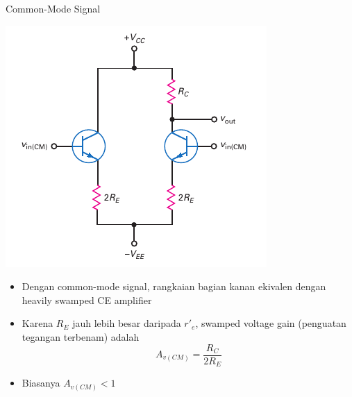 \documentclass[aspectratio=169]{beamer}
\begin{document}
\begin{frame}{Common-Mode Signal}
	\begin{multicols}{2}
		\begin{center}
			\includegraphics[height=0.7\textheight]{gambar/01.diff-amp/01.fig20}
		\end{center}
		\columnbreak
		\begin{itemize}
			\item Dengan common-mode signal, rangkaian bagian kanan ekivalen dengan heavily swamped CE amplifier
			\item Karena $ R_E $ jauh lebih besar daripada $ r'_e $, swamped voltage gain (penguatan tegangan terbenam) adalah
			\begin{equation}\label{pers.20}
				A_{v(CM)} = \frac{R_C}{2R_E}
			\end{equation}
			\item Biasanya $ A_{v(CM)} < 1 $
		\end{itemize}
	\end{multicols}
\end{frame}
\end{document}
